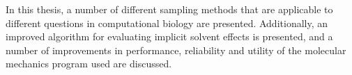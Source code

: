 In this thesis, a number of different sampling methods that are applicable to different questions in computational biology are presented.
Additionally, an improved algorithm for evaluating implicit solvent effects is presented, and a number of improvements in performance, reliability and utility of the molecular mechanics program used are discussed.
